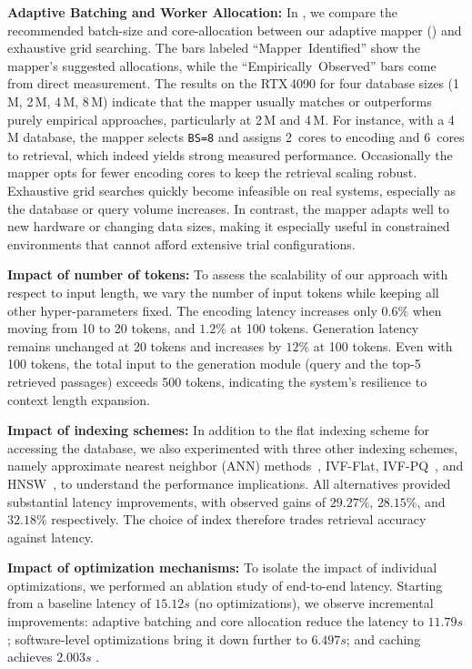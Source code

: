 \noindent\textbf{Adaptive Batching and Worker Allocation: }In , we compare the recommended batch-size and core-allocation between our adaptive mapper () and exhaustive grid searching. The bars labeled ``Mapper~Identified'' show the mapper’s suggested allocations, while the ``Empirically~Observed'' bars come from direct measurement. The results on the RTX\,4090 for four database sizes (1\,M, 2\,M, 4\,M, 8\,M) indicate that the mapper usually matches or outperforms purely empirical approaches, particularly at 2\,M and 4\,M. For instance, with a 4\,M database, the mapper selects \texttt{BS=8} and assigns 2~cores to encoding and 6~cores to retrieval, which indeed yields strong measured performance. Occasionally the mapper opts for fewer encoding cores to keep the retrieval scaling robust. Exhaustive grid searches quickly become infeasible on real systems, especially as the database or query volume increases. In contrast, the mapper adapts well to new hardware or changing data sizes, making it especially useful in constrained environments that cannot afford extensive trial configurations.

\noindent\textbf{Impact of number of tokens: }To assess the scalability of our approach with respect to input length, we vary the number of input tokens while keeping all other hyper-parameters fixed. The encoding latency increases only $0.6\%$ when moving from 10 to 20 tokens, and $1.2\%$ at 100 tokens. Generation latency remains unchanged at 20 tokens and increases by $12\%$ at 100 tokens. Even with 100 tokens, the total input to the generation module (query and the top-5 retrieved passages) exceeds 500 tokens, indicating the system’s resilience to context length expansion.

\noindent\textbf{Impact of indexing schemes: }In addition to the flat indexing scheme for accessing the database, we also experimented with three other indexing schemes, namely approximate nearest neighbor (ANN) methods~\cite{l2,faiss}, IVF-Flat, IVF-PQ~\cite{ivfpq}, and HNSW~\cite{hnsw}, to understand the performance implications. All alternatives provided substantial latency improvements, with observed gains of $29.27\%$, $28.15\%$, and $32.18\%$ respectively. The choice of index therefore trades retrieval accuracy against latency.

\noindent\textbf{Impact of optimization mechanisms: }To isolate the impact of individual optimizations, we performed an ablation study of end-to-end latency. Starting from a baseline latency of $15.12s$ (no optimizations), we observe incremental improvements: adaptive batching and core allocation reduce the latency to $11.79s$; software-level optimizations bring it down further to $6.497s$; and caching achieves $2.003s$ .

